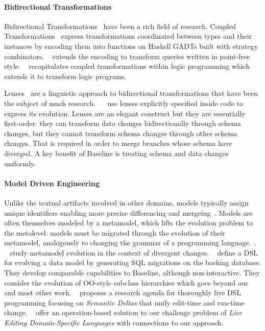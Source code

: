 \documentclass[english,submission]{programming}
\theoremstyle{definition}
\newcommand{\citet}[1]{\citeauthor*{#1}~\cite{#1}}
\newcommand{\myparagraph}[1]{\vspace{-8pt}\paragraph{#1}}
\begin{document}
\myparagraph{Bidirectional Transformations}
 Bidirectional Transformations~\cite{czarnecki2009bidirectional, hu2024bidirectional} have been a rich field of research.
Coupled Transformations~\cite{Berdaguer07, alcino06, Cleve2006} express transformations coordinated between types and their instances by encoding them into functions on Haskell GADTs built with strategy combinators. \citet{JVisser08} extends the encoding to transform queries written in point-free style. \citet{lammel16} recapitulates coupled transformations within logic programming which extends it to transform logic programs.

Lenses~\cite{Foster2007,edit-lenses} are a linguistic approach to bidirectional transformations that have been the subject of much research.
 ~\citet{carvalho24} use lenses explicitly specified inside code to express its evolution. Lenses are an elegant construct but they are essentially first-order: they can transform data changes bidirectionally through schema changes, but they cannot transform schema changes through other schema changes. That is required in order to merge branches whose schema have diverged. A key benefit of Baseline is treating schema and data changes uniformly.

\myparagraph{Model Driven Engineering}
Unlike the textual artifacts involved in other domains, models typically assign unique identifiers enabling more precise differencing and mergeing~\cite{alanen2003}.
Models are often themselves modeled by a metamodel, which lifts the evolution problem to the metalevel: models must be migrated through the evolution of their metamodel, analogously to changing the grammar of a programming language.~\cite{Herrmannsdoerfer11}. \citet{Cicchetti11} study metamodel evolution in the context of divergent changes.
\citet{vermolen11} define a DSL for evolving a data model by generating SQL migrations on the backing database. They develop comparable capabilities to Baseline, although non-interactive. They consider the evolution of OO-style subclass hierarchies which goes beyond our and most other work.
\citet{SemanticDeltas} proposes a research agenda for thoroughly live DSL programming focusing on \emph{Semantic Deltas} that unify edit-time and run-time change.
\citet{exelmans25} offer an operation-based solution to our challenge problem of \textit{Live Editing Domain-Specific Languages} with connections to our approach.
\end{document}
